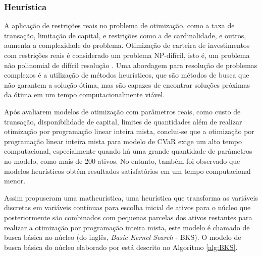            \subsubsection{Heurística}

                \ipar A aplicação de restrições reais no problema de otimização, como a taxa de transação, limitação de capital, e restrições como a de cardinalidade, e outros, aumenta a complexidade do problema. Otimização de carteira de investimentos com restrições reais é considerado um problema NP-difícil, isto é, um problema não polinomial de difícil resolução \cite{milhomem2020analysis}. Uma abordagem para resolução de problemas complexos é a utilização de métodos heurísticos, que são métodos de busca que não garantem a solução ótima, mas são capazes de encontrar soluções próximas da ótima em um tempo computacionalmente viável.


        
                    \ipar Após  avaliarem modelos de otimização com parâmetros reais, como custo de transação, disponibilidade de capital, limites de quantidades além de realizar otimização por programação linear inteira mista, conclui-se que a otimização por programação linear inteira mista para modelo de CVaR exige um alto tempo computacional, especialmente quando há uma grande quantidade de parâmetros no modelo, como mais de 200 ativos. No entanto, também foi observado que modelos heurísticos obtém resultados satisfatórios em um tempo computacional menor.
                
                    \ipar Assim propuseram uma matheurística, uma heurística que transforma as variáveis discretas em variáveis contínuas para escolha inicial de ativos para o núcleo que posteriormente são combinados com pequenas parcelas dos ativos restantes para realizar a otimização por programação inteira mista, este modelo é chamado de busca básica no núcleo (do inglês, \textit{Basic Kernel Search} - BKS). O modelo de busca básica do núcleo elaborado por  está descrito no Algoritmo \ref{alg:BKS}.
                
